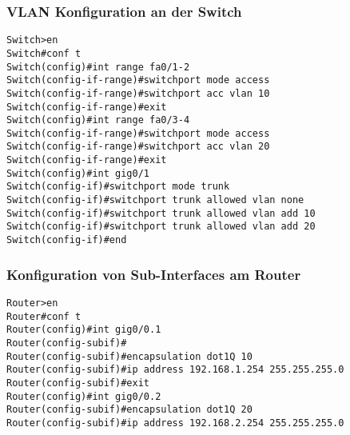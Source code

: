 \subsubsection{VLAN Konfiguration an der Switch}
\begin{lstlisting}[basicstyle=\fontsize{10}{11}\selectfont\ttfamily]
Switch>en
Switch#conf t
Switch(config)#int range fa0/1-2
Switch(config-if-range)#switchport mode access
Switch(config-if-range)#switchport acc vlan 10
Switch(config-if-range)#exit
Switch(config)#int range fa0/3-4
Switch(config-if-range)#switchport mode access
Switch(config-if-range)#switchport acc vlan 20
Switch(config-if-range)#exit
Switch(config)#int gig0/1
Switch(config-if)#switchport mode trunk
Switch(config-if)#switchport trunk allowed vlan none
Switch(config-if)#switchport trunk allowed vlan add 10
Switch(config-if)#switchport trunk allowed vlan add 20
Switch(config-if)#end
\end{lstlisting}
\subsubsection{Konfiguration von Sub-Interfaces am Router}
\begin{lstlisting}[basicstyle=\fontsize{10}{11}\selectfont\ttfamily]
Router>en
Router#conf t
Router(config)#int gig0/0.1
Router(config-subif)#
Router(config-subif)#encapsulation dot1Q 10
Router(config-subif)#ip address 192.168.1.254 255.255.255.0
Router(config-subif)#exit
Router(config)#int gig0/0.2
Router(config-subif)#encapsulation dot1Q 20
Router(config-subif)#ip address 192.168.2.254 255.255.255.0
\end{lstlisting}
